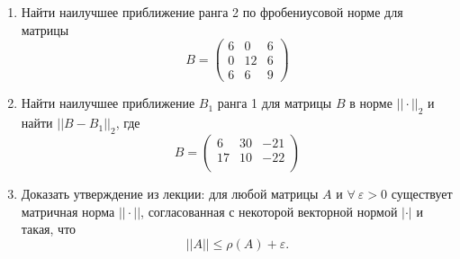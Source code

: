 \documentclass[12pt]{article}
\theoremstyle{definition}
\numberwithin{equation}{section}
\begin{document}
\begin{enumerate}
\item
Найти наилучшее приближение ранга 2 по фробениусовой норме для матрицы 
\[B = \begin{pmatrix}
6 & 0 & 6\\
0 & 12 & 6\\
6 & 6 & 9
\end{pmatrix}\]

    \item Найти наилучшее приближение $B_1$ ранга 1 для матрицы $B$ в норме $||\cdot||_2$ и найти $||B-B_1||_2$, где
\[B = \begin{pmatrix}
6 & 30 & -21\\
17 & 10 & -22\\
\end{pmatrix}\]

    \item Доказать утверждение из лекции: для любой матрицы $A$ и $\forall~ \varepsilon>0$ существует матричная норма $||\cdot ||$, согласованная с некоторой векторной нормой $|\cdot|$ и такая, что $$||A||\leqslant \rho(A) + \varepsilon .$$
\end{enumerate}
\end{document}
